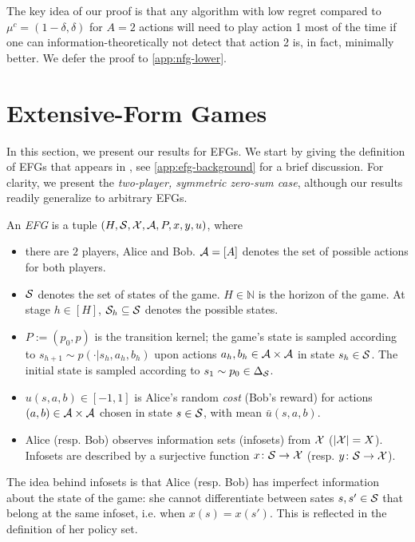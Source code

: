 \documentclass[11pt]{article}
\begin{document}
The key idea of our proof is that any algorithm with low regret compared to $\mu^c=(1-\delta,\delta)$ for $A=2$ actions will need to play action 1 most of the time if one can information-theoretically not detect that action 2 is, in fact, minimally better. We defer the proof to \cref{app:nfg-lower}.


\section{Extensive-Form Games} \label{sec:efg}

In this section, we present our results for EFGs. We start by giving the definition of EFGs that appears in \citet{kozuno2021model,bai2022near,fiegel2023adapting,fiegel2023local}, see \cref{app:efg-background} for a brief discussion. For clarity, we present the \textit{two-player, symmetric zero-sum case}, although our results readily generalize to arbitrary EFGs.

\begin{definition}\label{d:efg}
    An \emph{EFG} is a tuple $(H,\mathcal{S},\mathcal{X},\mathcal{A},P,x,y,u)$, where 
    \begin{itemize}[leftmargin=*]
        \item there are $2$ players, Alice and Bob. $\mathcal{A}=[A]$ denotes the set of possible actions for both players.
        \item $\mathcal{S}$ denotes the set of states of the game. $H \in \mathbb{N}$ is the horizon of the game. At stage $h \in [H]$, $\mathcal{S}_h \subseteq \mathcal{S}$ denotes the possible states. 
        \item $P:=(p_0,p)$ is the transition kernel; the game's state is sampled according to $s_{h+1} \sim p(\cdot | s_h, a_h , b_{h})$ upon actions $a_h, b_h \in \mathcal{A} \times \mathcal{A}$ in state $s_h \in \mathcal{S}$. The initial state is sampled according to $s_1\sim p_0\in\Delta_{\mathcal{S}}$.
        \item $u(s,a,b) \in[-1,1]$ is Alice's random \emph{cost} (Bob's reward) for actions $(a,b) \in \mathcal{A}\times\mathcal{A}$ chosen in state $s \in \mathcal{S}$, with mean $\bar{u}(s,a,b)$.
        \item Alice (resp. Bob) observes information sets (infosets) from $\mathcal{X}$ ($|\mathcal{X}|=X$). Infosets are described by a surjective function $x \colon \mathcal{S} \to \mathcal{X}$ (resp. $y\colon \mathcal{S} \to \mathcal{X}$).
    \end{itemize}
\end{definition}

\noindent The idea behind infosets is that Alice (resp. Bob) has imperfect information about the state of the game: she cannot differentiate between sates $s,s' \in \mathcal{S}$ that belong at the same infoset, i.e. when $x(s) = x(s')$. This is reflected in the definition of her policy set. 
\end{document}
